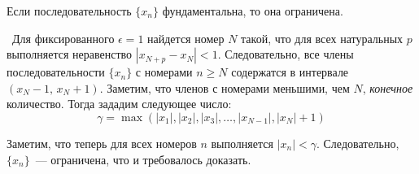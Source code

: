 \begin{lemma}
Если последовательность \(\{x_{n}\}\) фундаментальна, то она ограничена.

\vspace{3mm}

\proofname~Для фиксированного \(\epsilon = 1\) найдется номер \(N\) такой, что
для всех натуральных \(p\) выполняется неравенство \(|x_{N+p} - x_{N}| < 1\).
Следовательно, все члены последовательности \(\{x_{n}\}\) с номерами \(n \geq N\)
содержатся в интервале \((x_{N} - 1, \, x_{N} + 1)\). Заметим, что членов с номерами
меньшими, чем \(N\), \textit{конечное} количество. Тогда зададим следующее число:
\[
\gamma = \max(|x_{1}|, |x_{2}|, |x_{3}|, \dots, |x_{N-1}|, |x_{N}| + 1)
\]

Заметим, что теперь для всех номеров \(n\) выполняется \(|x_{n}| < \gamma\).
Следовательно, \(\{x_{n}\}\)~--- ограничена, что и требовалось доказать.~\qedsymbol
\end{lemma}

